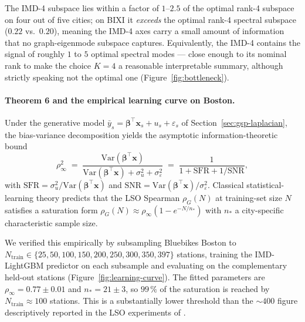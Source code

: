 The IMD-4 subspace lies within a factor of $1$--$2.5$ of the
optimal rank-4 subspace on four out of five cities; on BIXI it
\emph{exceeds} the optimal rank-4 spectral subspace
($0.22$ vs.\ $0.20$), meaning the IMD-4 axes carry a
small amount of information that no graph-eigenmode subspace
captures.  Equivalently, the IMD-4 contains the signal of
roughly $1$ to $5$ optimal spectral modes — close enough to its
nominal rank to make the choice $K = 4$ a reasonable
interpretable summary, although strictly speaking not the
optimal one (Figure~\ref{fig:bottleneck}).

\paragraph{Theorem 6 and the empirical learning curve on Boston.}
Under the generative model
$\bar y_s = \boldsymbol{\beta}^\top \mathbf{x}_s + u_s + \varepsilon_s$
of Section~\ref{sec:gsp-laplacian}, the bias-variance
decomposition yields the asymptotic information-theoretic bound
\begin{equation}
    \rho_\infty^2 \;=\; \frac{\mathrm{Var}(\boldsymbol{\beta}^\top \mathbf{x})}
                        {\mathrm{Var}(\boldsymbol{\beta}^\top \mathbf{x}) + \sigma_u^2 + \sigma_\varepsilon^2}
    \;=\; \frac{1}{1 + \mathrm{SFR} + 1/\mathrm{SNR}},
    \label{eq:rho-inf-bound}
\end{equation}
with $\mathrm{SFR} = \sigma_u^2 / \mathrm{Var}(\boldsymbol{\beta}^\top \mathbf{x})$ and
$\mathrm{SNR} = \mathrm{Var}(\boldsymbol{\beta}^\top \mathbf{x}) / \sigma_\varepsilon^2$.
Classical statistical-learning theory \citep{Hastie2009} predicts
that the LSO Spearman $\rho_G(N)$ at training-set size $N$
satisfies a saturation form
$\rho_G(N) \approx \rho_\infty (1 - e^{-N/n_*})$ with $n_*$ a
city-specific characteristic sample size.

We verified this empirically by subsampling Bluebikes Boston to
$N_{\mathrm{train}} \in \{25, 50, 100, 150, 200, 250, 300, 350,
397\}$ stations, training the IMD-LightGBM predictor on each
subsample and evaluating on the complementary held-out
stations (Figure~\ref{fig:learning-curve}).  The fitted
parameters are
$\rho_\infty = 0.77 \pm 0.01$ and $n_* = 21 \pm 3$, so $99\,\%$
of the saturation is reached by $N_{\mathrm{train}} \approx 100$
stations.  This is a substantially lower threshold than the
$\sim 400$ figure descriptively reported in
the LSO experiments of \citet{Fosse2026imd_national}.


